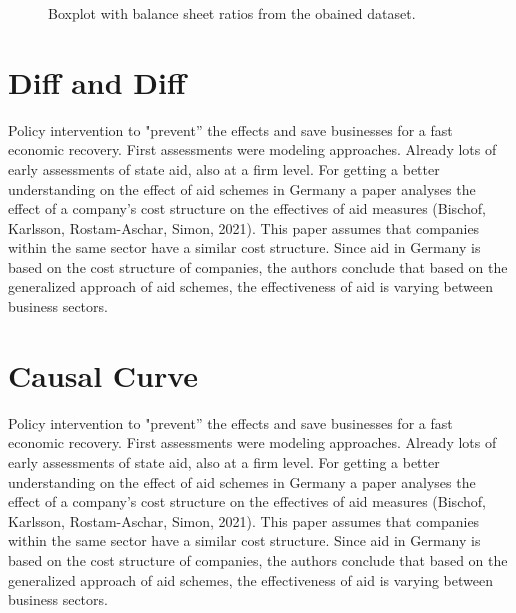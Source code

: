 \begin{figure}
\centering
{}%

\decoRule
\caption[Balance sheet ratios]{Boxplot with balance sheet ratios from the obained dataset.}
\label{fig:Ratios}
\end{figure}



\section{Diff and Diff}

Policy intervention to "prevent” the effects and save businesses for a fast economic recovery.
First assessments were modeling approaches.
Already lots of early assessments of state aid, also at a firm level.
For getting a better understanding on the effect of aid schemes in Germany a paper analyses the effect of a company’s cost structure on the effectives of aid measures (Bischof, Karlsson, Rostam-Aschar, Simon, 2021). 
This paper assumes that companies within the same sector have a similar cost structure. 
Since aid in Germany is based on the cost structure of companies, the authors conclude that based on the generalized approach of aid schemes, the effectiveness of aid is varying between business sectors.



\section{Causal Curve}

Policy intervention to "prevent” the effects and save businesses for a fast economic recovery.
First assessments were modeling approaches.
Already lots of early assessments of state aid, also at a firm level.
For getting a better understanding on the effect of aid schemes in Germany a paper analyses the effect of a company’s cost structure on the effectives of aid measures (Bischof, Karlsson, Rostam-Aschar, Simon, 2021). 
This paper assumes that companies within the same sector have a similar cost structure. 
Since aid in Germany is based on the cost structure of companies, the authors conclude that based on the generalized approach of aid schemes, the effectiveness of aid is varying between business sectors.